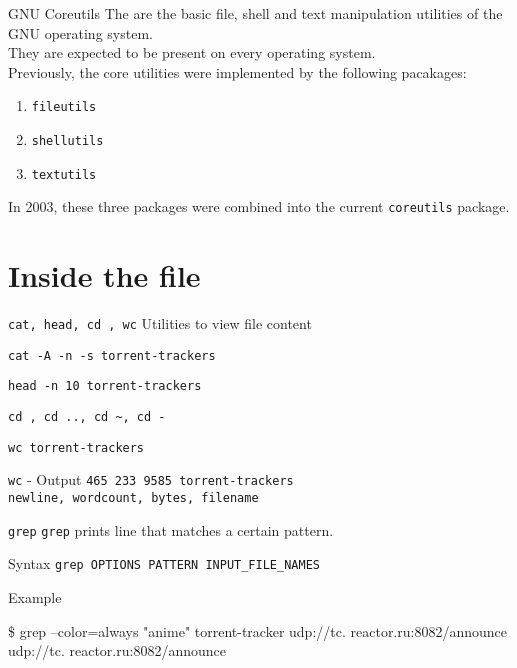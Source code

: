 \documentclass[11pt]{beamer}
\begin{document}
		\begin{frame}{GNU Coreutils}
			The {\textbf{\color{darkpurple}{GNU Core Utilities} } } are the basic file, shell and text manipulation utilities of the GNU operating system. \\
				They are expected to be present on every operating system. \\
				Previously, the core utilities were implemented by the following pacakages:
				\begin{enumerate}
				  \item \texttt{fileutils} 
				  \item \texttt{shellutils} 
				  \item \texttt{textutils}
				\end{enumerate}	
				In 2003, these three packages were combined into the current \texttt{coreutils} package.
		\end{frame}

	\section[File]{Inside the file}

			\begin{frame}{\texttt{cat, head, cd , wc}}
				Utilities to view file content
				\begin{example}
					\texttt{cat -A -n -s torrent-trackers}
				\end{example}
				\begin{example}
					\texttt{head -n 10 torrent-trackers}
				\end{example}
				\begin{example}
					\texttt{cd , cd .., cd \textasciitilde, cd -}
				\end{example}
				\begin{example}
					\texttt{wc torrent-trackers}
				\end{example}
				{
					\begin{alertblock}{\texttt{wc} - Output}
						\texttt{465  233 9585 torrent-trackers} \\
						\tiny \texttt{newline, wordcount, bytes, filename}
					\end{alertblock}
				}
			\end{frame}

			\begin{frame}{\texttt{grep}}
				\texttt{grep} prints line that matches a certain pattern.
				\begin{alertblock}{Syntax}
					\texttt{grep OPTIONS PATTERN INPUT\_FILE\_NAMES}
				\end{alertblock}
				\begin{exampleblock}{Example}
					\begin{semiverbatim}
						\$ grep --color=always "anime" torrent-tracker
						udp://tc.{\textbf{\color{red}{anime} } }reactor.ru:8082/announce
						udp://tc.{\textbf{\color{red}{anime} } }reactor.ru:8082/announce 
					\end{semiverbatim}	
				\end{exampleblock}
			\end{frame}
\end{document}
